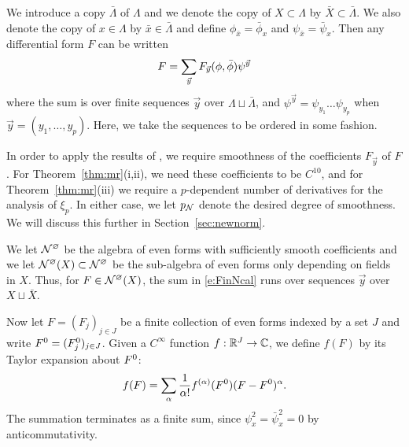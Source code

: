 We introduce a copy $\bar\Lambda$ of $\Lambda$
and we denote the copy of $X \subset \Lambda$ by $\bar X \subset \bar\Lambda$.
We also denote the copy of $x \in \Lambda$
by $\bar x \in \bar\Lambda$ and define $\phi_{\bar x} = \bar\phi_x$ and $\psi_{\bar x} = \bar\psi_x$.
Then any differential form $F$ can be written
\begin{equation}
\lbeq{FinNcal}
F
=
\sum_{\vec y}
F_{\vec y} (\phi, \bar\phi)
\psi^{\vec y}
\end{equation}
where the sum is over finite sequences $\vec y$ over $\Lambda\sqcup\bar\Lambda$,
and $\psi^{\vec y} = \psi_{y_1} \ldots \psi_{y_p}$
when $\vec y = (y_1, \ldots, y_p)$. Here, we take the sequences to be ordered in
some  fashion.

In order to apply the results of \cite{BBS-saw4-log,BBS-saw4,BSTW-clp}, we require
smoothness of the coefficients $F_{\vec y}$ of $F$.  For Theorem~\ref{thm:mr}(i,ii),
we need these coefficients to be $C^{10}$, and for Theorem~\ref{thm:mr}(iii) we require
a $p$-dependent number of derivatives for the analysis of $\xi_p$.
In either case, we let $p_{\mathcal{N}}$ denote the desired degree of smoothness.
We will discuss this further in Section~\ref{sec:newnorm}.

We let $\mathcal{N}^\varnothing$ be the algebra of even forms with sufficiently smooth coefficients
and we let $\mathcal{N}^\varnothing(X) \subset \mathcal{N}^\varnothing$ be the sub-algebra of even forms only depending on fields
in $X$. Thus, for $F \in \mathcal{N}^\varnothing(X)$, the sum in \eqref{e:FinNcal} runs over sequences
$\vec y$ over $X \sqcup \bar X$.

Now let $F = (F_j)_{j \in J}$ be a finite collection of even forms
indexed by a set $J$
and write $F^0 = (F^0_j)_{j \in J}$.
Given a $C^\infty$ function $f : {\mathbb R}^J \rightarrow \mathbb{C}$, we define
$f(F)$ by its Taylor expansion about $F^0$:
\begin{equation}
f(F) = \sum_\alpha \frac{1}{\alpha!} f^{(\alpha)}(F^0) (F - F^0)^\alpha.
\end{equation}
The summation terminates as a finite sum, since $\psi_x^2 = \bar\psi_x^2 = 0$
by anticommutativity.

